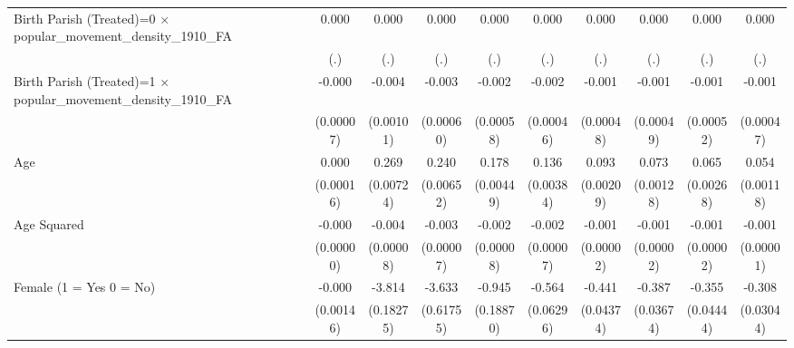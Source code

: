 {\begin{tabular}{l*{9}{c}}
Birth Parish (Treated)=0 $\times$ popular\_movement\_density\_1910\_FA&       0.000         &       0.000         &       0.000         &       0.000         &       0.000         &       0.000         &       0.000         &       0.000         &       0.000         \\
                    &         (.)         &         (.)         &         (.)         &         (.)         &         (.)         &         (.)         &         (.)         &         (.)         &         (.)         \\
Birth Parish (Treated)=1 $\times$ popular\_movement\_density\_1910\_FA&      -0.000         &      -0.004\sym{***}&      -0.003\sym{***}&      -0.002\sym{***}&      -0.002\sym{***}&      -0.001\sym{**} &      -0.001\sym{*}  &      -0.001         &      -0.001         \\
                    &   (0.00007)         &   (0.00101)         &   (0.00060)         &   (0.00058)         &   (0.00046)         &   (0.00048)         &   (0.00049)         &   (0.00052)         &   (0.00047)         \\
Age                 &       0.000         &       0.269\sym{***}&       0.240\sym{***}&       0.178\sym{***}&       0.136\sym{***}&       0.093\sym{***}&       0.073\sym{***}&       0.065\sym{***}&       0.054\sym{***}\\
                    &   (0.00016)         &   (0.00724)         &   (0.00652)         &   (0.00449)         &   (0.00384)         &   (0.00209)         &   (0.00128)         &   (0.00268)         &   (0.00118)         \\
Age Squared         &      -0.000         &      -0.004\sym{***}&      -0.003\sym{***}&      -0.002\sym{***}&      -0.002\sym{***}&      -0.001\sym{***}&      -0.001\sym{***}&      -0.001\sym{***}&      -0.001\sym{***}\\
                    &   (0.00000)         &   (0.00008)         &   (0.00007)         &   (0.00008)         &   (0.00007)         &   (0.00002)         &   (0.00002)         &   (0.00002)         &   (0.00001)         \\
Female (1 = Yes 0 = No)&      -0.000         &      -3.814\sym{***}&      -3.633\sym{***}&      -0.945\sym{***}&      -0.564\sym{***}&      -0.441\sym{***}&      -0.387\sym{***}&      -0.355\sym{***}&      -0.308\sym{***}\\
                    &   (0.00146)         &   (0.18275)         &   (0.61755)         &   (0.18870)         &   (0.06296)         &   (0.04374)         &   (0.03674)         &   (0.04444)         &   (0.03044)         \\

\end{tabular}}
